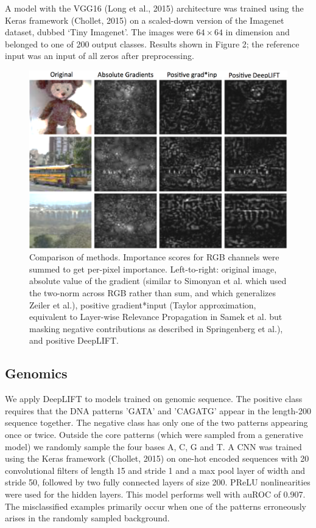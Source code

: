 \documentclass{article}
\begin{document}
A model with the VGG16 (Long et al., 2015) architecture was trained using the Keras framework (Chollet, 2015) on a scaled-down version of the Imagenet dataset, dubbed `Tiny Imagenet'. The images were $64 \times 64$ in dimension and belonged to one of 200 output classes. Results shown in Figure 2; the reference input was an input of all zeros after preprocessing.
\begin{figure}[!ht]
\begin{center}
\includegraphics[scale=0.3]{TinyImagenetDeepLIFT.png}
\caption{Comparison of methods. Importance scores for RGB channels were summed to get per-pixel importance. Left-to-right: original image, absolute value of the gradient (similar to Simonyan et al. which used the two-norm across RGB rather than sum, and which generalizes Zeiler et al.), positive gradient*input (Taylor approximation, equivalent to Layer-wise Relevance Propagation in Samek et al. but masking negative contributions as described in Springenberg et al.), and positive DeepLIFT.}
\end{center}
\vspace{-20px}
\end{figure}
\subsection{Genomics}
We apply DeepLIFT to models trained on genomic sequence. The positive class requires that the DNA patterns 'GATA' and 'CAGATG' appear in the length-200 sequence together. The negative class has only one of the two patterns appearing once or twice. Outside the core patterns (which were sampled from a generative model) we randomly sample the four bases A, C, G and T. A CNN was trained using the Keras framework (Chollet, 2015) on one-hot encoded sequences with 20 convolutional filters of length 15 and stride 1 and a max pool layer of width and stride 50, followed by two fully connected layers of size 200. PReLU nonlinearities were used for the hidden layers. This model performs well with auROC of 0.907. The misclassified examples primarily occur when one of the patterns erroneously arises in the randomly sampled background. %
\end{document}
